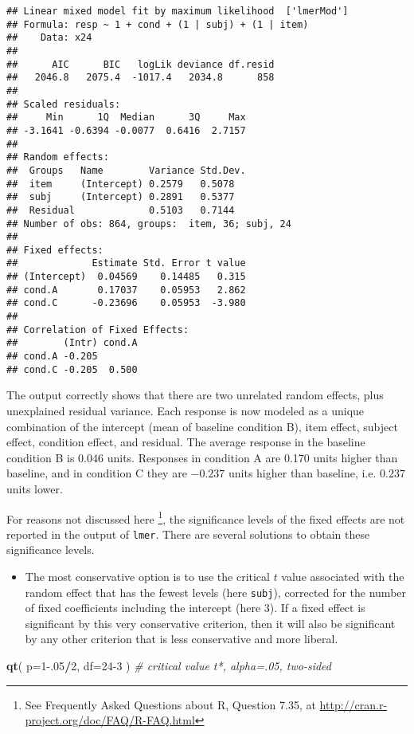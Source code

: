\documentclass[]{book}
\newenvironment{Shaded}{\begin{snugshade}}{\end{snugshade}}
\newcommand{\CommentTok}[1]{\textcolor[rgb]{0.56,0.35,0.01}{\textit{#1}}}
\newcommand{\DataTypeTok}[1]{\textcolor[rgb]{0.13,0.29,0.53}{#1}}
\newcommand{\DecValTok}[1]{\textcolor[rgb]{0.00,0.00,0.81}{#1}}
\newcommand{\FloatTok}[1]{\textcolor[rgb]{0.00,0.00,0.81}{#1}}
\newcommand{\KeywordTok}[1]{\textcolor[rgb]{0.13,0.29,0.53}{\textbf{#1}}}
\newcommand{\NormalTok}[1]{#1}
\newcommand{\OperatorTok}[1]{\textcolor[rgb]{0.81,0.36,0.00}{\textbf{#1}}}
\providecommand{\tightlist}{%
  \setlength{\itemsep}{0pt}\setlength{\parskip}{0pt}}
\begin{document}
\begin{verbatim}
## Linear mixed model fit by maximum likelihood  ['lmerMod']
## Formula: resp ~ 1 + cond + (1 | subj) + (1 | item)
##    Data: x24
## 
##      AIC      BIC   logLik deviance df.resid 
##   2046.8   2075.4  -1017.4   2034.8      858 
## 
## Scaled residuals: 
##     Min      1Q  Median      3Q     Max 
## -3.1641 -0.6394 -0.0077  0.6416  2.7157 
## 
## Random effects:
##  Groups   Name        Variance Std.Dev.
##  item     (Intercept) 0.2579   0.5078  
##  subj     (Intercept) 0.2891   0.5377  
##  Residual             0.5103   0.7144  
## Number of obs: 864, groups:  item, 36; subj, 24
## 
## Fixed effects:
##             Estimate Std. Error t value
## (Intercept)  0.04569    0.14485   0.315
## cond.A       0.17037    0.05953   2.862
## cond.C      -0.23696    0.05953  -3.980
## 
## Correlation of Fixed Effects:
##        (Intr) cond.A
## cond.A -0.205       
## cond.C -0.205  0.500
\end{verbatim}

The output correctly shows that there are two unrelated random effects,
plus unexplained residual variance. Each response is now modeled as a
unique combination of the intercept (mean of baseline condition B), item
effect, subject effect, condition effect, and residual. The average
response in the baseline condition B is \(0.046\) units. Responses in
condition A are 0.170 units higher than baseline, and in condition C
they are \(-0.237\) units higher than baseline, i.e. \(0.237\) units lower.

For reasons not discussed here \footnote{See Frequently Asked Questions about R, Question
  7.35, at \url{http://cran.r-project.org/doc/FAQ/R-FAQ.html}}, the significance levels of the
fixed effects are not reported in the output of
\texttt{lmer}. There are several solutions to obtain
these significance levels.

\begin{itemize}
\tightlist
\item
  The most conservative option \citep{HMS18} is to use the critical \(t\) value
  associated with the random effect that has the fewest levels (here
  \texttt{subj}), corrected for the number of fixed
  coefficients including the intercept (here \(3\)).
  If a fixed effect is significant by this very
  conservative criterion, then it will also be significant by any other
  criterion that is less conservative and more liberal.
\end{itemize}

\begin{Shaded}
\begin{Highlighting}[]
\KeywordTok{qt}\NormalTok{( }\DataTypeTok{p=}\DecValTok{1}\FloatTok{-.05}\OperatorTok{/}\DecValTok{2}\NormalTok{, }\DataTypeTok{df=}\DecValTok{24-3}\NormalTok{ ) }\CommentTok{# critical value t*, alpha=.05, two-sided}
\end{Highlighting}
\end{Shaded}
\end{document}
